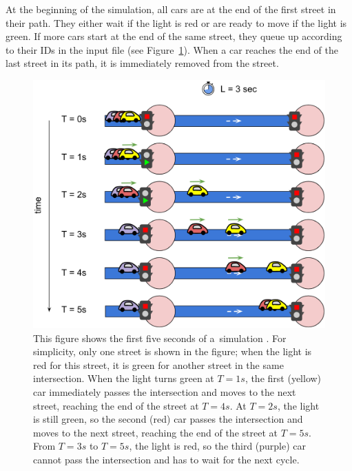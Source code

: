 At the beginning of the simulation, all cars are at the end of the first street in their path. They either wait if the light is red or are ready to move if the light is green. If more cars start at the end of the same street, they queue up according to their IDs in the input file (see Figure~\ref{fig:hashcode_street}). When a car reaches the end of the last street in its path, it is immediately removed from the street.

\begin{figure}[ht] %
    \centering
    \includegraphics[width=\linewidth]{img/hashcode/figure3.png}
    \caption[Example of cars driving through a street]{
        This figure shows the first five seconds of a~simulation \cite{google2023google}.
        For simplicity, only one street is shown in the figure; when the light is red for this street, it is green for another street in the same intersection.
        When the light turns green at $T=1s$, the first (yellow) car immediately passes the intersection and moves to the next street, reaching the end of the street at $T=4s$.
        At $T=2s$, the light is still green, so the second (red) car passes the intersection and moves to the next street, reaching the end of the street at $T=5s$.
        From $T=3s$ to $T=5s$, the light is red, so the third (purple) car cannot pass the intersection and has to wait for the next cycle.
    }
    \label{fig:hashcode_street}
\end{figure}

